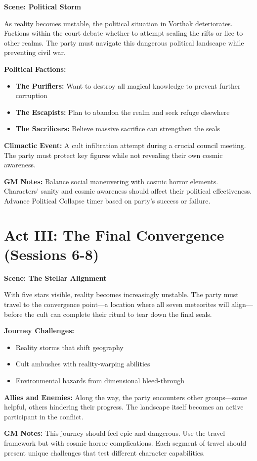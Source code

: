 \documentclass[12pt,twoside]{article}
\newenvironment{scene}[1]{%
  \vspace{0.5cm}
  \begin{center}
    \textbf{\large Scene: #1}
  \end{center}
  \vspace{0.3cm}
}{}
\begin{document}
\begin{scene}{Political Storm}
As reality becomes unstable, the political situation in Vorthak deteriorates. Factions within the court debate whether to attempt sealing the rifts or flee to other realms. The party must navigate this dangerous political landscape while preventing civil war.

\textbf{Political Factions:}
\begin{itemize}[leftmargin=*]
\item \textbf{The Purifiers:} Want to destroy all magical knowledge to prevent further corruption
\item \textbf{The Escapists:} Plan to abandon the realm and seek refuge elsewhere
\item \textbf{The Sacrificers:} Believe massive sacrifice can strengthen the seals
\end{itemize}

\textbf{Climactic Event:} A cult infiltration attempt during a crucial council meeting. The party must protect key figures while not revealing their own cosmic awareness.

\textbf{GM Notes:} Balance social maneuvering with cosmic horror elements. Characters' sanity and cosmic awareness should affect their political effectiveness. Advance Political Collapse timer based on party's success or failure.
\end{scene}

\section{Act III: The Final Convergence (Sessions 6-8)}

\begin{scene}{The Stellar Alignment}
With five stars visible, reality becomes increasingly unstable. The party must travel to the convergence point---a location where all seven meteorites will align---before the cult can complete their ritual to tear down the final seals.

\textbf{Journey Challenges:}
\begin{itemize}[leftmargin=*]
\item Reality storms that shift geography
\item Cult ambushes with reality-warping abilities
\item Environmental hazards from dimensional bleed-through
\end{itemize}

\textbf{Allies and Enemies:} Along the way, the party encounters other groups---some helpful, others hindering their progress. The landscape itself becomes an active participant in the conflict.

\textbf{GM Notes:} This journey should feel epic and dangerous. Use the travel framework but with cosmic horror complications. Each segment of travel should present unique challenges that test different character capabilities.
\end{scene}
\end{document}
